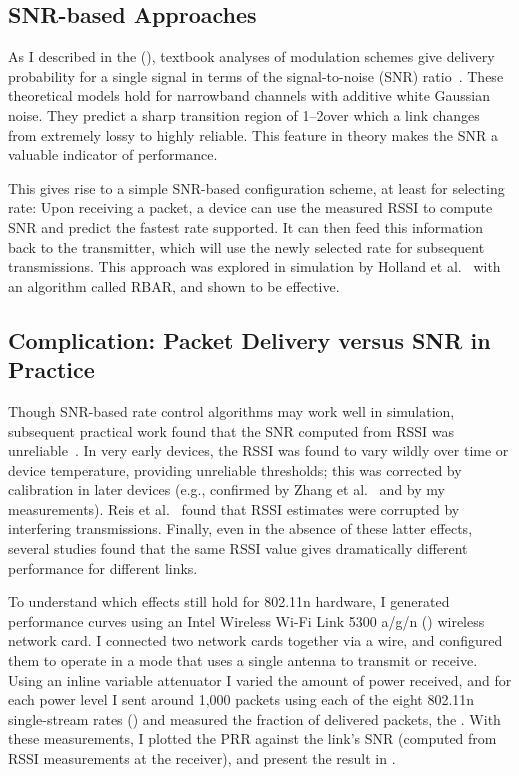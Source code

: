 \subsection{SNR-based Approaches}
As I described in the  (), textbook analyses of modulation schemes give delivery probability for a single signal in terms of the signal-to-noise (SNR) ratio~\cite{Goldsmith}.
These theoretical models hold for narrowband channels with additive white Gaussian noise. They predict a sharp transition region of 1--2\dB over which a link changes from extremely lossy to highly reliable. This feature in theory makes the SNR a valuable indicator of performance.

This gives rise to a simple SNR-based configuration scheme, at least for selecting rate: Upon receiving a packet, a device can use the measured RSSI to compute SNR and predict the fastest rate supported. It can then feed this information back to the transmitter, which will use the newly selected rate for subsequent transmissions. This approach was explored in simulation by Holland et al.~\cite{Holland_RBAR} with an algorithm called RBAR, and shown to be effective.

\subsection{Complication: Packet Delivery versus SNR in Practice}
Though SNR-based rate control algorithms may work well in simulation, subsequent practical work found that the SNR computed from RSSI was unreliable~\cite{Aguayo_Roofnet, Reis_interference, Zhao_sensys03}. In very early devices, the RSSI was found to vary wildly over time or device temperature, providing unreliable thresholds; this was corrected by calibration in later devices (e.g., confirmed by Zhang et al.~\cite{Zhang_SNRguided} and by my measurements). Reis et al.~\cite{Reis_interference} found that RSSI estimates were corrupted by interfering transmissions. Finally, even in the absence of these latter effects, several studies found that the same RSSI value gives dramatically different performance for different links.

To understand which effects still hold for 802.11n hardware, I generated performance curves using an Intel Wireless Wi-Fi Link 5300 a/g/n () wireless network card. I connected two network cards together via a wire, and configured them to operate in a mode that uses a single antenna to transmit or receive. Using an inline variable attenuator I varied the amount of power received, and for each power level I sent around 1,000 packets using each of the eight 802.11n single-stream rates () and measured the fraction of delivered packets, the . With these measurements, I plotted the PRR against the link's SNR (computed from RSSI measurements at the receiver), and present the result in . 

